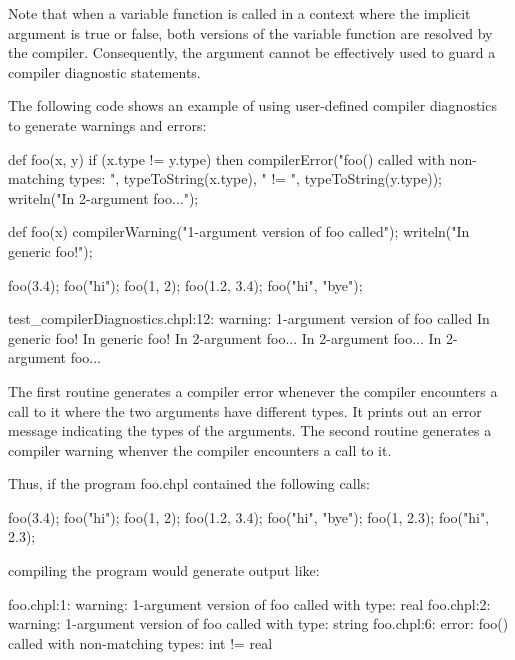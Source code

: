 Note that when a variable function is called in a context where the
implicit  argument is true or false, both versions of the
variable function are resolved by the compiler.  Consequently,
the  argument cannot be effectively used to guard a
compiler diagnostic statements.

\begin{example}
The following code shows an example of using user-defined compiler
diagnostics to generate warnings and errors:
\begin{chapelpre}
\end{chapelpre}
\begin{chapel}
def foo(x, y) {
  if (x.type != y.type) then
    compilerError("foo() called with non-matching types: ", 
                  typeToString(x.type), " != ", typeToString(y.type));
  writeln("In 2-argument foo...");
}

def foo(x) {
  compilerWarning("1-argument version of foo called");
  writeln("In generic foo!");
}
\end{chapel}
\begin{chapelpost}
foo(3.4);
foo("hi");
foo(1, 2);
foo(1.2, 3.4);
foo("hi", "bye");
\end{chapelpost}
\begin{chapeloutput}
test\_compilerDiagnostics.chpl:12: warning: 1-argument version of foo called
In generic foo!
In generic foo!
In 2-argument foo...
In 2-argument foo...
In 2-argument foo...
\end{chapeloutput}

The first routine generates a compiler error whenever the compiler
encounters a call to it where the two arguments have different types.
It prints out an error message indicating the types of the arguments.
The second routine generates a compiler warning whenver the compiler
encounters a call to it.

Thus, if the program foo.chpl contained the following calls:

\begin{numberedchapel}
foo(3.4);
foo("hi");
foo(1, 2);
foo(1.2, 3.4);
foo("hi", "bye");
foo(1, 2.3);
foo("hi", 2.3);
\end{numberedchapel}

\noindent compiling the program would generate output like:

\begin{commandline}
foo.chpl:1: warning: 1-argument version of foo called with type: real
foo.chpl:2: warning: 1-argument version of foo called with type: string
foo.chpl:6: error: foo() called with non-matching types: int != real
\end{commandline}

\end{example}

